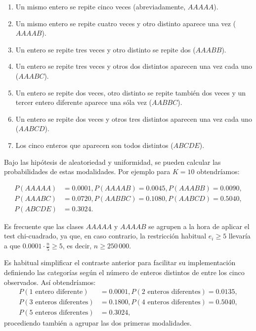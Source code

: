 \documentclass[
]{book}
\theoremstyle{break}
\theoremstyle{definition}
\theoremstyle{definition}
\theoremstyle{definition}
\theoremstyle{remark}
\begin{document}
\begin{enumerate}
\def\labelenumi{\arabic{enumi}.}
\item
  Un mismo entero se repite cinco veces (abreviadamente, \(AAAAA\)).
\item
  Un mismo entero se repite cuatro veces y otro distinto aparece una
  vez (\(AAAAB\)).
\item
  Un entero se repite tres veces y otro distinto se repite dos
  (\(AAABB\)).
\item
  Un entero se repite tres veces y otros dos distintos aparecen una
  vez cada uno (\(AAABC\)).
\item
  Un entero se repite dos veces, otro distinto se repite también dos
  veces y un tercer entero diferente aparece una sóla vez (\(AABBC\)).
\item
  Un entero se repite dos veces y otros tres distintos aparecen una
  vez cada uno (\(AABCD\)).
\item
  Los cinco enteros que aparecen son todos distintos (\(ABCDE\)).
\end{enumerate}

Bajo las hipótesis de aleatoriedad y uniformidad, se pueden calcular las probabilidades de estas modalidades. Por ejemplo para \(K=10\) obtendríamos:

\[\begin{aligned}
P(AAAAA) & =0.0001, P(AAAAB)=0.0045, P(AAABB)=0.0090,\\
P(AAABC) & =0.0720, P(AABBC)=0.1080, P(AABCD)=0.5040,\\
P(ABCDE) & =0.3024.
\end{aligned}\]

Es frecuente que las clases \(AAAAA\) y \(AAAAB\) se agrupen a la hora de
aplicar el test chi-cuadrado, ya que, en caso contrario, la restricción
habitual \(e_{i}\geq5\) llevaría a que \(0.0001\cdot\frac{n}{5}\geq5\), es
decir, \(n\geq250\,000\).

Es habitual simplificar el contraste anterior para facilitar su implementación definiendo las categorías según el número de enteros distintos de entre los cinco observados.
Así obtendríamos:
\[\begin{aligned}
P(\text{1 entero diferente}) & = 0.0001,
P(\text{2 enteros diferentes}) = 0.0135,\\
P(\text{3 enteros diferentes}) & = 0.1800, 
P(\text{4 enteros diferentes}) = 0.5040,\\
P(\text{5 enteros diferentes}) & = 0.3024,
\end{aligned}\]
procediendo también a agrupar las dos primeras modalidades.
\end{document}
